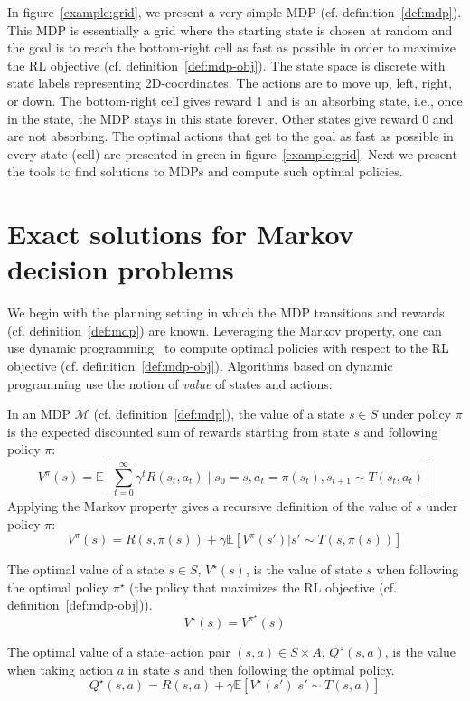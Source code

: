 In figure~\ref{example:grid}, we present a very simple MDP (cf. definition~\ref{def:mdp}).
This MDP is essentially a grid where the starting state is chosen at random and the goal is to reach the bottom-right cell as fast as possible in order to maximize the RL objective (cf. definition~\ref{def:mdp-obj}).
The state space is discrete with state labels representing 2D-coordinates.
The actions are to move up, left, right, or down. 
The bottom-right cell gives reward 1 and is an absorbing state, i.e., once in the state, the MDP stays in this state forever.
Other states give reward 0 and are not absorbing.
The optimal actions that get to the goal as fast as possible in every state (cell) are presented in green in figure~\ref{example:grid}.
Next we present the tools to find solutions to MDPs and compute such optimal policies.

\section{Exact solutions for Markov decision problems}\label{sec:values}
We begin with the planning setting in which the MDP transitions and rewards (cf. definition~\ref{def:mdp}) are known. 
Leveraging the Markov property, one can use dynamic programming~\cite{Bellman} to compute optimal policies with respect to the RL objective (cf. definition~\ref{def:mdp-obj}).
Algorithms based on dynamic programming use the notion of \textit{value} of states and actions:
\begin{definition}\label{def:vs} 
    In an MDP $\mathcal{M}$ (cf. definition~\ref{def:mdp}), the value of a state $s\in S$ under policy $\pi$ is the expected discounted sum of rewards starting from state $s$ and following policy $\pi$:
    $$V^\pi(s) = \mathbb{E}\left[\sum_{t=0}^{\infty} \gamma^t R(s_t, a_t) \mid s_0 = s, a_t = \pi(s_t), s_{t+1} \sim T(s_t, a_t)\right]$$
    Applying the Markov property gives a recursive definition of the value of $s$ under policy $\pi$:
    $$V^\pi(s) = R(s,\pi(s)) + \gamma \mathbb{E}\left[V^\pi(s') | s'\sim T(s, \pi(s))\right]$$
\end{definition}
\begin{definition} The optimal value of a state $s\in S$, $V^\star(s)$, is the value of state $s$ when following the optimal policy $\pi^{\star}$ (the policy that maximizes the RL objective (cf. definition~\ref{def:mdp-obj})).
    $$V^{\star}(s) = V^{\pi^{\star}}(s)$$
\end{definition}
\begin{definition}\label{def:qvalues} The optimal value of a state–action pair $(s,a)\in S\times A$, $Q^\star(s,a)$, is the value when taking action $a$ in state $s$ and then following the optimal policy.
    $$Q^{\star}(s,a) = R(s, a) + \gamma\mathbb{E}\left[V^{\star}(s') | s'\sim T(s, a)\right]$$
\end{definition}

